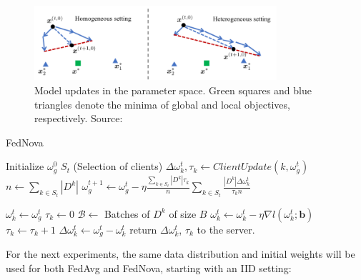 \begin{figure}[H]
  \centering
  \includegraphics[width=0.8\textwidth]{figures/2-Federated_Learning/FedNova_Normalization_model_drift.png}
  \caption{Model updates in the parameter space. Green squares and blue triangles denote the minima of global and local objectives, respectively. Source: \cite{wang2020}}
  \label{fig:FedNova_Normalization_model_drif}
\end{figure}

\begin{algorithm}[H]
  \label{alg:FedNova}
  \caption{FedNova}
  \begin{algorithmic}[1]
    \Statex
    \State Initialize $\omega_g^0$
      \State $S_t$  (Selection of clients)
        \State $\Delta \omega_k^{t}, \tau_k \gets ClientUpdate(k, \omega_g^t)$
      \EndFor
      \State $n \gets \sum_{k \in S_t} |D^k|$
      \State $\omega_g^{t+1} \gets \omega_g^t - \eta \frac{\sum_{k \in S_t} |D^k| \tau_k}{n} \sum_{k \in S_t} \frac{|D^k| \Delta \omega_k^t}{\tau_k n}$
    \EndFor
    \EndProcedure

    \State $\omega_k^t \gets \omega_g^t$
    \State $\tau_k \gets 0$
    \State $\mathcal{B} \gets$ Batches of $D^k$ of size $B$
        \State $\omega_k^t \gets \omega_k^t - \eta \nabla l(\omega_k^t; \mathbf{b})$
        \State $\tau_k \gets \tau_k + 1$
      \EndFor
    \EndFor
    \State $\Delta \omega_k^t \gets \omega_g^t - \omega_k^t$
    \State return $\Delta \omega_k^t$, $\tau_k$  to the server.
    \EndProcedure
  \end{algorithmic}
\end{algorithm}

For the next experiments, the same data distribution and initial weights will be used for both FedAvg and FedNova, starting with an IID setting:


